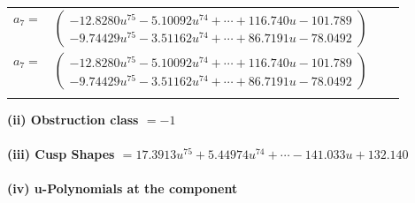 \documentclass[1p]{elsarticle_modified}
\theoremstyle{definition}
\begin{document}
\begin{tabular}{m{7pt} m{180pt} m{7pt} m{180pt} }
\flushright $a_{7}=$&$\begin{pmatrix}-12.8280 u^{75}-5.10092 u^{74}+\cdots+116.740 u-101.789\\-9.74429 u^{75}-3.51162 u^{74}+\cdots+86.7191 u-78.0492\end{pmatrix}$\\ \flushright $a_{7}=$&$\begin{pmatrix}-12.8280 u^{75}-5.10092 u^{74}+\cdots+116.740 u-101.789\\-9.74429 u^{75}-3.51162 u^{74}+\cdots+86.7191 u-78.0492\end{pmatrix}$\\&\end{tabular}
\flushleft \textbf{(ii) Obstruction class $= -1$}\\~\\
\flushleft \textbf{(iii) Cusp Shapes $= 17.3913 u^{75}+5.44974 u^{74}+\cdots-141.033 u+132.140$}\\~\\
\newpage\renewcommand{\arraystretch}{1}
\flushleft \textbf{(iv) u-Polynomials at the component}\newline \\
\end{document}

